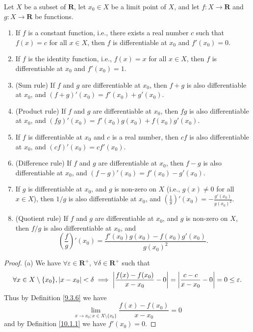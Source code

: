 \begin{theorem}\label{10.1.13}
    Let \(X\) be a subset of \(\mathbf{R}\), let \(x_0 \in X\) be a limit point of \(X\), and let \(f : X \to \mathbf{R}\) and \(g : X \to \mathbf{R}\) be functions.
    \begin{enumerate}
        \item If \(f\) is a constant function, i.e., there exists a real number \(c\) such that \(f(x) = c\) for all \(x \in X\), then \(f\) is differentiable at \(x_0\) and \(f'(x_0) = 0\).
        \item If \(f\) is the identity function, i.e., \(f(x) = x\) for all \(x \in X\), then \(f\) is differentiable at \(x_0\) and \(f'(x_0) = 1\).
        \item (Sum rule)
              If \(f\) and \(g\) are differentiable at \(x_0\), then \(f + g\) is also differentiable at \(x_0\), and \((f + g)'(x_0) = f'(x_0) + g'(x_0)\).
        \item (Product rule)
              If \(f\) and \(g\) are differentiable at \(x_0\), then \(fg\) is also differentiable at \(x_0\), and \((fg)'(x_0) = f'(x_0)g(x_0) + f(x_0)g'(x_0)\).
        \item If \(f\) is differentiable at \(x_0\) and \(c\) is a real number, then \(cf\) is also differentiable at \(x_0\), and \((cf)'(x_0) = cf'(x_0)\).
        \item (Difference rule)
              If \(f\) and \(g\) are differentiable at \(x_0\), then \(f - g\) is also differentiable at \(x_0\), and \((f - g)'(x_0) = f'(x_0) - g'(x_0)\).
        \item If \(g\) is differentiable at \(x_0\), and \(g\) is non-zero on \(X\) (i.e., \(g(x) \neq 0\) for all \(x \in X\)), then \(1 / g\) is also differentiable at \(x_0\), and \((\frac{1}{g})'(x_0) = -\frac{g'(x_0)}{g(x_0)^2}\).
        \item (Quotient rule)
              If \(f\) and \(g\) are differentiable at \(x_0\), and \(g\) is non-zero on \(X\), then \(f / g\) is also differentiable at \(x_0\), and
              \[
                  (\frac{f}{g})'(x_0) = \frac{f'(x_0) g(x_0) - f(x_0) g'(x_0)}{g(x_0)^2}.
              \]
    \end{enumerate}
\end{theorem}

\begin{proof}{(a)}
    We have \(\forall \varepsilon \in \mathbf{R}^+\), \(\forall \delta \in \mathbf{R}^+\) such that
    \[
        \forall x \in X \setminus \{x_0\}, \abs*{x - x_0} < \delta \implies \abs*{\frac{f(x) - f(x_0)}{x - x_0} - 0} = \abs*{\frac{c - c}{x - x_0} - 0} = 0 \leq \varepsilon.
    \]
    Thus by Definition \ref{9.3.6} we have
    \[
        \lim_{x \to x_0 ; x \in X \setminus \{x_0\}} \frac{f(x) - f(x_0)}{x - x_0} = 0
    \]
    and by Definition \ref{10.1.1} we have \(f'(x_0) = 0\).
\end{proof}

